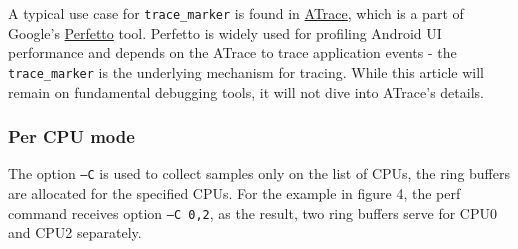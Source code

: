 \documentclass[11pt]{diazessay} %
\def\code#1{\texttt{#1}}
\begin{document}
A typical use case for \code{trace\_marker} is found in
\href{https://perfetto.dev/docs/data-sources/atrace}{ATrace}, which is a
part of Google's \href{https://ui.perfetto.dev/}{Perfetto} tool. Perfetto
is widely used for profiling Android UI performance and depends on the
ATrace to trace application events - the \code{trace\_marker} is the
underlying mechanism for tracing. While this article will remain on
fundamental debugging tools, it will not dive into ATrace's details.

\subsubsection*{Per CPU mode}

The option \code{--C} is used to collect samples only on the list of CPUs, the ring buffers are allocated for the specified CPUs.  For the example in figure 4, the perf command receives option \code{--C 0,2}, as the result, two ring buffers serve for CPU0 and CPU2 separately.
\end{document}
